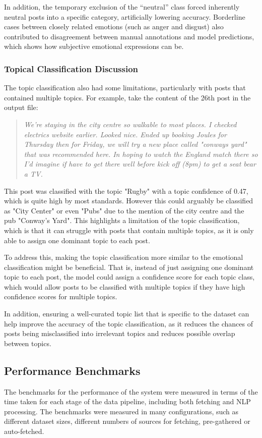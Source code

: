 \documentclass[12pt, a4paper]{article}
\begin{document}
In addition, the temporary exclusion of the “neutral” class forced inherently neutral posts into a specific category, artificially lowering accuracy. Borderline cases between closely related emotions (such as anger and disgust) also contributed to disagreement between manual annotations and model predictions, which shows how subjective emotional expressions can be.

\subsubsection{Topical Classification Discussion}
The topic classification also had some limitations, particularly with posts that contained multiple topics. For example, take the content of the 26th post in the output file:
\begin{quote}
    \textit{We're staying in the city centre so walkable to most places. I checked electrics website earlier. Looked nice. Ended up booking Joules for Thursday then for Friday, we will try a new place called "conways yard" that was recommended here. In hoping to watch the England match there so I'd imagine if have to get there well before kick off (8pm) to get a seat bear a TV.}
\end{quote}

This post was classified with the topic "Rugby" with a topic confidence of 0.47, which is quite high by most standards. However this could arguably be classified as "City Center" or even "Pubs" due to the mention of the city centre and the pub "Conway's Yard". This highlights a limitation of the topic classification, which is that it can struggle with posts that contain multiple topics, as it is only able to assign one dominant topic to each post. 

To address this, making the topic classification more similar to the emotional classification might be beneficial. That is, instead of just assigning one dominant topic to each post, the model could assign a confidence score for each topic class, which would allow posts to be classified with multiple topics if they have high confidence scores for multiple topics.

In addition, ensuring a well-curated topic list that is specific to the dataset can help improve the accuracy of the topic classification, as it reduces the chances of posts being misclassified into irrelevant topics and reduces possible overlap between topics.

\subsection{Performance Benchmarks}
The benchmarks for the performance of the system were measured in terms of the time taken for each stage of the data pipeline, including both fetching and NLP processing. The benchmarks were measured in many configurations, such as different dataset sizes, different numbers of sources for fetching, pre-gathered or auto-fetched.
\end{document}
